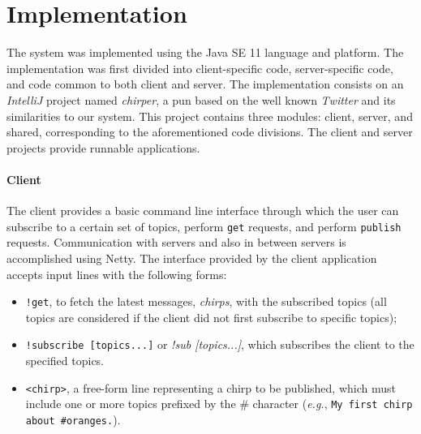
\section{Implementation}
\label{sec:implementation}

The system was implemented using the Java SE 11 language and platform. The implementation was first divided into client-specific code, server-specific code, and code common to both client and server. 
The implementation consists on an \emph{IntelliJ} project named \emph{chirper}, a pun based on the well known \emph{Twitter} and its similarities to our system. This project contains three modules: client, server, and shared, corresponding to the aforementioned code divisions. The client and server projects provide runnable applications.



\paragraph{Client}

The client provides a basic command line interface through which the user can subscribe to a certain set of topics, perform \texttt{get} requests, and perform \texttt{publish} requests. Communication with servers and also in between servers is accomplished using Netty. The interface provided by the client application accepts input lines with the following forms:

\begin{itemize}
    \item \texttt{!get}, to fetch the latest messages, \emph{chirps}, with the subscribed topics (all topics are considered if the client did not first subscribe to specific topics);
    \item \texttt{!subscribe [topics...]} or \emph{!sub [topics...]}, which subscribes the client to the specified topics. %
    \item \texttt{<chirp>}, a free-form line representing a chirp to be published, which must include one or more topics prefixed by the \# character (\emph{e.g.}, \texttt{My first chirp about \#oranges.}).
\end{itemize}

